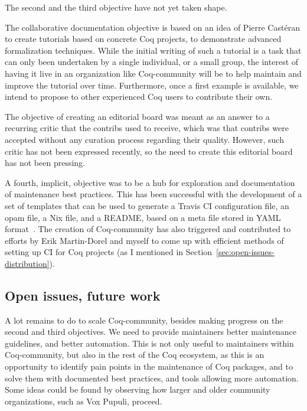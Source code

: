 The second and the third objective have not yet taken shape.

The collaborative documentation objective is based on an idea of Pierre Cast\'eran to create tutorials based on concrete Coq projects, to demonstrate advanced formalization techniques.
While the initial writing of such a tutorial is a task that can only been undertaken by a single individual, or a small group, the interest of having it live in an organization like Coq-community will be to help maintain and improve the tutorial over time.
Furthermore, once a first example is available, we intend to propose to other experienced Coq users to contribute their own.

The objective of creating an editorial board was meant as an answer to a recurring critic that the contribs used to receive, which was that contribs were accepted without any curation process regarding their quality.
However, such critic has not been expressed recently, so the need to create this editorial board has not been pressing.

A fourth, implicit, objective was to be a hub for exploration and documentation of maintenance best practices.
This has been successful with the development of a set of templates that can be used to generate a Travis CI configuration file, an opam file, a Nix file, and a README, based on a meta file stored in YAML format~\cite{benkiki2009yaml}.
The creation of Coq-community has also triggered and contributed to efforts by Erik Martin-Dorel and myself to come up with efficient methods of setting up CI for Coq projects (as I mentioned in Section~\ref{sec:open-issues-distribution}).

\subsection{Open issues, future work}

\label{sec:open-issues-coq-community}

A lot remains to do to scale Coq-community, besides making progress on the second and third objectives.
We need to provide maintainers better maintenance guidelines, and better automation.
This is not only useful to maintainers within Coq-community, but also in the rest of the Coq ecosystem, as this is an opportunity to identify pain points in the maintenance of Coq packages, and to solve them with documented best practices, and tools allowing more automation.
Some ideas could be found by observing how larger and older community organizations, such as Vox Pupuli, proceed.

